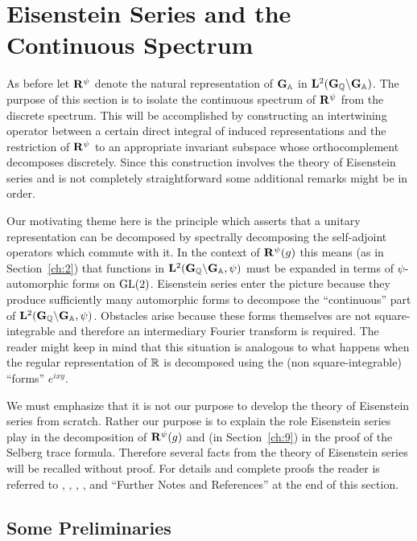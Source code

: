 \chapter{Eisenstein Series and the Continuous Spectrum}

\label{ch:8}

As before let $\mathbf{R}^{\psi}$ denote the natural representation of $\mathbf{G}_{\mathbb{A}}$ in $\mathbf{L}^{2}(\mathbf{G}_{\mathbb{Q}}\backslash\mathbf{G}_{\mathbb{A}})$. The purpose of this section is to isolate the continuous spectrum of $\mathbf{R}^{\psi}$ from the discrete spectrum. This will be accomplished by constructing an intertwining operator between a certain direct integral of induced representations and the restriction of $\mathbf{R}^{\psi}$ to an appropriate invariant subspace whose orthocomplement decomposes discretely. Since this construction involves the theory of Eisenstein series and is not completely straightforward some additional remarks might be in order.

Our motivating theme here is the principle which asserts that a unitary representation can be decomposed by spectrally decomposing the self-adjoint operators which commute with it. In the context of $\mathbf{R}^{\psi}(g)$ this means (as in Section~\ref{ch:2}) that functions in $\mathbf{L}^{2}(\mathbf{G}_{\mathbb{Q}}\backslash\mathbf{G}_{\mathbb{A}},\psi)$ must be expanded in terms of $\psi$-automorphic forms on $\operatorname{GL}(2)$. Eisenstein series enter the picture because they produce sufficiently many automorphic forms to decompose the ``continuous'' part of $\mathbf{L}^{2}(\mathbf{G}_{\mathbb{Q}}\backslash\mathbf{G}_{\mathbb{A}},\psi)$. Obstacles arise because these forms themselves are not square-integrable and therefore an intermediary Fourier transform is required. The reader might keep in mind that this situation is analogous to what happens when the regular representation of $\mathbb{R}$ is decomposed using the (non square-integrable) ``forms'' $e^{ixy}$.

We must emphasize that it is not our purpose to develop the theory of Eisenstein series from scratch. Rather our purpose is to explain the role Eisenstein series play in the decomposition of $\mathbf{R}^{\psi}(g)$ and (in Section~\ref{ch:9}) in the proof of the Selberg trace formula. Therefore several facts from the theory of Eisenstein series will be recalled without proof. For details and complete proofs the reader is referred to \cite{Selberg}, \cite{Langlands4}, \cite{HarishChandra2}, \cite{Langlands5}, \cite{Kubota} and ``Further Notes and References'' at the end of this section.

\section{Some Preliminaries}\label{sec:8a}

